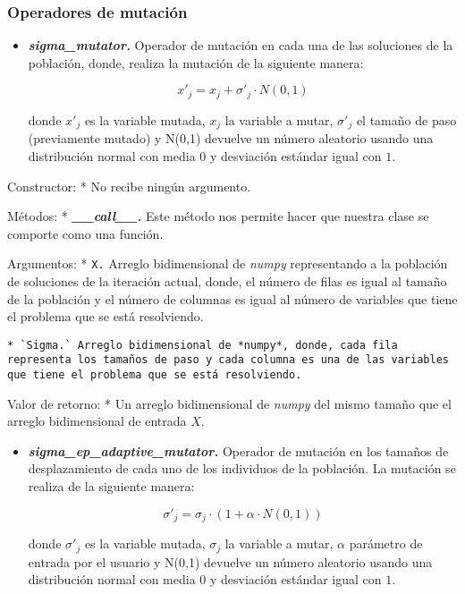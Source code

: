 \documentclass[11pt]{article}
\begin{document}
\subsubsection{Operadores de mutación}\label{operadores-de-mutaciuxf3n}

\begin{itemize}
\item
  \emph{\textbf{sigma\_mutator.}} Operador de mutación en cada una de
  las soluciones de la población, donde, realiza la mutación de la
  siguiente manera:

  \begin{equation}
   x'_j = x_j + \sigma'_j \cdot N(0,1)
  \end{equation}

  donde \(x'_j\) es la variable mutada, \(x_j\) la variable a mutar,
  \(\sigma'_j\) el tamaño de paso (previamente mutado) y N(0,1) devuelve
  un número aleatorio usando una distribución normal con media \(0\) y
  desviación estándar igual con \(1\).
\end{itemize}

Constructor: * No recibe ningún argumento.

Métodos: * \emph{\textbf{\_\_call\_\_.}} Este método nos permite hacer
que nuestra clase se comporte como una función.

Argumentos: * \texttt{X.} Arreglo bidimensional de \emph{numpy}
representando a la población de soluciones de la iteración actual,
donde, el número de filas es igual al tamaño de la población y el número
de columnas es igual al número de variables que tiene el problema que se
está resolviendo.

\begin{verbatim}
* `Sigma.` Arreglo bidimensional de *numpy*, donde, cada fila representa los tamaños de paso y cada columna es una de las variables que tiene el problema que se está resolviendo.
\end{verbatim}

Valor de retorno: * Un arreglo bidimensional de \emph{numpy} del mismo
tamaño que el arreglo bidimensional de entrada \(X\).

\begin{itemize}
\item
  \emph{\textbf{sigma\_ep\_adaptive\_mutator.}} Operador de mutación en
  los tamaños de desplazamiento de cada uno de los individuos de la
  población. La mutación se realiza de la siguiente manera:

  \begin{equation}
   \sigma'_j = \sigma_j \cdot ( 1 + \alpha \cdot N(0,1))
  \end{equation}

  donde \(\sigma'_j\) es la variable mutada, \(\sigma_j\) la variable a
  mutar, \(\alpha\) parámetro de entrada por el usuario y N(0,1)
  devuelve un número aleatorio usando una distribución normal con media
  \(0\) y desviación estándar igual con \(1\).
\end{itemize}
\end{document}
